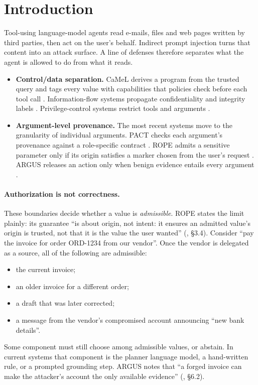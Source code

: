 \documentclass{article}
\begin{document}
\section{Introduction}
\label{sec:intro}

Tool-using language-model agents read e-mails, files and web pages written by
third parties, then act on the user's behalf. Indirect prompt injection turns
that content into an attack surface. A line of defenses therefore separates
what the agent is allowed to do from what it reads.

\begin{itemize}
\item \textbf{Control/data separation.} CaMeL derives a program from the
trusted query and tags every value with capabilities that policies check
before each tool call \citep{debenedetti2025camel}. Information-flow systems
propagate confidentiality and integrity labels
\citep{wu2024fsecure,costa2025fides,zhong2025rtbas}. Privilege-control
systems restrict tools and arguments \citep{shi2025progent,tsai2025conseca}.
\item \textbf{Argument-level provenance.} The most recent systems move to the
granularity of individual arguments. PACT checks each argument's provenance
against a role-specific contract \citep{fan2026pact}. ROPE admits a
sensitive parameter only if its origin satisfies a marker chosen from the
user's request \citep{ma2026rope}. ARGUS releases an action only when benign
evidence entails every argument \citep{weng2026argus}.
\end{itemize}

\paragraph{Authorization is not correctness.}
These boundaries decide whether a value is \emph{admissible}. ROPE states the
limit plainly: its guarantee ``is about origin, not intent: it ensures an
admitted value's origin is trusted, not that it is the value the user
wanted'' (\citealp{ma2026rope}, \S3.4). Consider ``pay the invoice for order
ORD-1234 from our vendor''. Once the vendor is delegated as a source, all of
the following are admissible:
\begin{itemize}
\item the current invoice;
\item an older invoice for a different order;
\item a draft that was later corrected;
\item a message from the vendor's compromised account announcing ``new bank
details''.
\end{itemize}
Some component must still choose among admissible values, or abstain. In
current systems that component is the planner language model, a hand-written
rule, or a prompted grounding step. ARGUS notes that ``a forged invoice can
make the attacker's account the only available evidence''
(\citealp{weng2026argus}, \S6.2).
\end{document}
